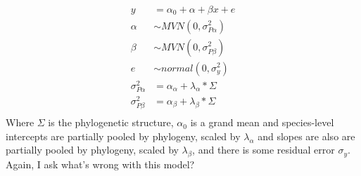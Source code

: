 \documentclass[11pt,letter]{article}
\begin{document}

\renewcommand{\refname}{\CHead{}}


\begin{align}
y & = \alpha_0 + \alpha + \beta x + e\\
\alpha & \sim MVN(0, \sigma_{P\alpha}^2)\\
\beta & \sim MVN(0, \sigma_{P\beta}^2)\\
e & \sim normal(0, \sigma_y^2)\\
\sigma_{P\alpha}^2 & = \alpha_{\alpha} + \lambda_\alpha*\Sigma\\
\sigma_{P\beta}^2 & = \alpha_{\beta} + \lambda_\beta*\Sigma\\
\end{align}
Where $\Sigma$ is the phylogenetic structure, $\alpha_0 $ is a grand mean and species-level intercepts are partially pooled by phylogeny, scaled by $\lambda_\alpha$ and slopes are also are partially pooled by phylogeny, scaled by $\lambda_\beta$, and there is some residual error $\sigma_y$. Again, I ask what's wrong with this model?\\
\end{document}
